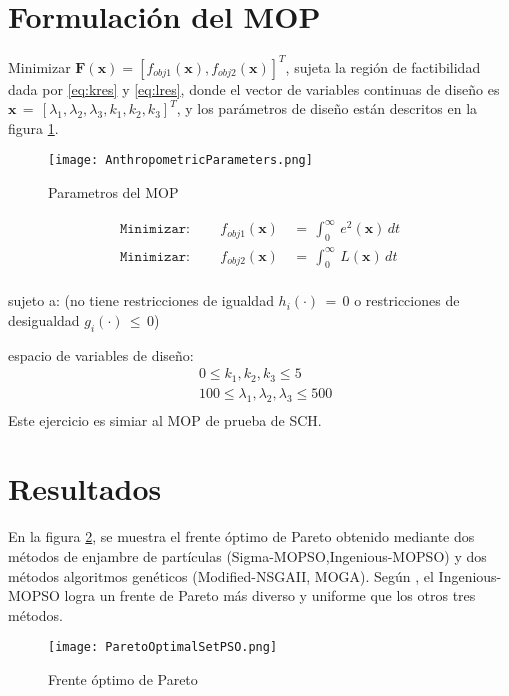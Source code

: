 \documentclass[10pt,onecolumn,twoside,letterpaper]{article}
\newcommand{\myreferences}{../../../doc/review/review/library}
\begin{document}
\begin{multicols}{2}
\section{Formulaci\'on del MOP}
\par Minimizar $\mathbf{F(\mathbf{x})}=[f_{obj1}(\mathbf{x}),f_{obj2}(\mathbf{x})]^T$, sujeta la regi\'on de factibilidad dada por \ref{eq:kres} y \ref{eq:lres}, donde el vector de variables continuas de dise\~no es $\mathbf{x}\,=\,[\lambda_1,\lambda_2,\lambda_3,k_1,k_2,k_3]^T$, y los par\'ametros de dise\~no est\'an descritos en la figura \ref{fig:paramsMOP}.
\begin{figure}[H]
  \centering
  \texttt{[image: AnthropometricParameters.png]}
  \caption{Parametros del MOP}
  \label{fig:paramsMOP}
\end{figure}
\begin{eqnarray*}
  \mathtt{Minimizar:\qquad} f_{obj1}(\mathbf{x})\,&=\,\int_0^{\infty}\,e^2(\mathbf{x})\,dt\\
  \mathtt{Minimizar:\qquad} f_{obj2}(\mathbf{x})\,&=\,\int_0^{\infty}\,L(\mathbf{x})\,dt\\
\end{eqnarray*}
\par sujeto a: (no tiene restricciones de igualdad $h_i(\cdot)\,=\,0$ o restricciones de desigualdad $g_i(\cdot)\,\leq\,0$)
\par espacio de variables de dise\~no:
\begin{eqnarray*}
 &0\leq k_1,k_2,k_3\leq 5\\
  &100\leq \lambda_1,\lambda_2,\lambda_3\leq 500\\
\end{eqnarray*}
Este ejercicio es simiar al MOP de prueba de SCH.
\section{Resultados}
En la figura \ref{fig:pareto}, se muestra el frente \'optimo de Pareto obtenido mediante dos m\'etodos de enjambre de part\'iculas (Sigma-MOPSO,Ingenious-MOPSO) y dos m\'etodos algoritmos gen\'eticos (Modified-NSGAII, MOGA). Seg\'un \cite{Mahmoodabadi2014}, el Ingenious-MOPSO logra un frente de Pareto m\'as diverso y uniforme que los otros tres m\'etodos.
\begin{figure}[H]
  \centering
  \texttt{[image: ParetoOptimalSetPSO.png]}
  \caption{Frente \'optimo de Pareto}
  \label{fig:pareto}
\end{figure}
\end{multicols}

\end{document}
